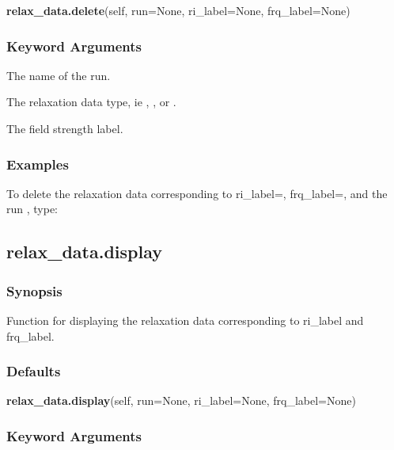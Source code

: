  \textsf{\textbf{relax\_data.delete}(self, run=None, ri\_label=None, frq\_label=None)} 

  
 \subsubsection{Keyword Arguments} 

   The name of the run.   

   The relaxation data type, ie , , or .   

   The field strength label.  

  

  
 \subsubsection{Examples} 

 To delete the relaxation data corresponding to ri\_label=, frq\_label=, and the run , type: 
  


  

 \newpage 

 \subsection{relax\_data.display} 

  
 \subsubsection{Synopsis} 

 Function for displaying the relaxation data corresponding to ri\_label and frq\_label. 
  

  
 \subsubsection{Defaults} 

 \textsf{\textbf{relax\_data.display}(self, run=None, ri\_label=None, frq\_label=None)} 

  
 \subsubsection{Keyword Arguments} 


